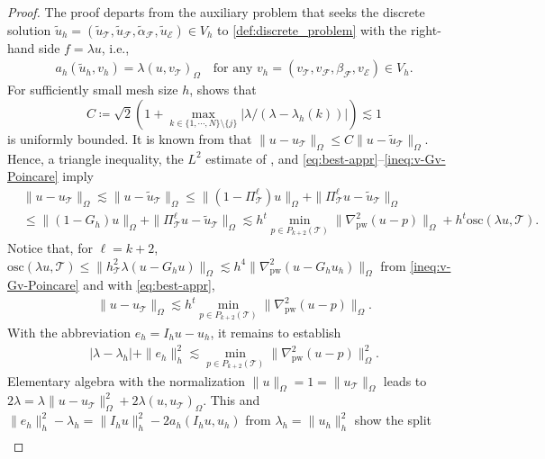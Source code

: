 \documentclass[a4paper]{amsart}
\numberwithin{equation}{section}
\def\F{\mathcal{F}}
\def\E{\mathcal{E}}
\def\T{\mathcal{T}}
\def\pw{\mathrm{pw}}
\theoremstyle{definition}
\theoremstyle{remark}
\numberwithin{theorem}{section}
\numberwithin{equation}{section}
\numberwithin{table}{section}
\numberwithin{figure}{section}
\begin{document}
\begin{proof}
	The proof departs from the auxiliary problem that seeks the discrete solution $\widetilde{u}_h = (\widetilde{u}_\T, \widetilde{u}_\F, \widetilde{\alpha}_\F, \widetilde{u}_\E) \in V_h$ to \eqref{def:discrete_problem} with the right-hand side $f = \lambda u$, i.e.,
	\begin{align*}
		a_h(\widetilde{u}_h, v_h) = \lambda(u, v_\T)_\Omega\quad\text{for any } v_h = (v_\T, v_\F, \beta_\F, v_\E) \in V_h.
	\end{align*}
	For sufficiently small mesh size $h$,  shows that 
    $$C \coloneqq \sqrt{2}(1 + \max_{k \in \{1,\cdots,N\} \setminus \{j\}}|\lambda /(\lambda-\lambda_h(k))|) \lesssim 1$$
    is uniformly bounded. It is known from \cite[Lemma 2.4]{CarstensenGallistlSchedensack2015} that
	$\| u - u_\T\|_\Omega \leq C \|u - \widetilde{u}_\T\|_\Omega$.
	Hence, a triangle inequality, the $L^2$ estimate of , and \eqref{eq:best-appr}--\eqref{ineq:v-Gv-Poincare} imply
	\begin{align*}
		&\|u - u_\T\|_\Omega \lesssim \|u - \widetilde{u}_\T\|_\Omega \leq \|(1 - \Pi_\T^\ell) u\|_\Omega + \|\Pi_\T^\ell u - \widetilde u_\T\|_\Omega\\
		&\leq \|(1 - G_h) u\|_\Omega + \|\Pi_\T^{\ell} u - \widetilde u_\T\|_\Omega \lesssim h^{t}\min_{p \in P_{k+2}(\T)} \|\nabla_\pw^2(u - p)\|_\Omega + h^{t}\mathrm{osc}(\lambda u, \T).
	\end{align*}
	Notice that, for $\ell = k+2$, $\mathrm{osc}(\lambda u, \T) \leq \|h_\T^2\lambda(u - G_h u)\|_\Omega \lesssim h^{4} \|\nabla_\pw^2(u - G_h u_h)\|_\Omega$ from \eqref{ineq:v-Gv-Poincare} and with \eqref{eq:best-appr},
	\begin{align}\label{ineq:L2-eig}
		\|u - u_\T\|_\Omega \lesssim h^{t}\min_{p \in P_{k+2}(\T)} \|\nabla_\pw^2(u - p)\|_\Omega.
	\end{align}
	With the abbreviation $e_h = I_h u - u_h$, it remains to establish
	\begin{align*}
		|\lambda - \lambda_h| + \|e_h\|_{h}^2 \lesssim \min_{p \in P_{k+2}(\T)} \|\nabla_\pw^2(u - p)\|_\Omega^2.
	\end{align*}
	Elementary algebra with the normalization $\|u\|_\Omega = 1= \|u_\T\|_\Omega$ leads to $2\lambda = \lambda\|u - u_\T\|_\Omega^2 + 2\lambda(u,u_\T)_{\Omega}$. This and $\|e_h\|_{h}^2 - \lambda_h = \|I_h u\|_{h}^2 - 2a_h(I_h u, u_h)$ from $\lambda_h = \|u_h\|_h^2$ show the split 
	\begin{align}\label{eq:proof-a-pr-eig-split}

\end{align}
\end{proof}
\end{document}
